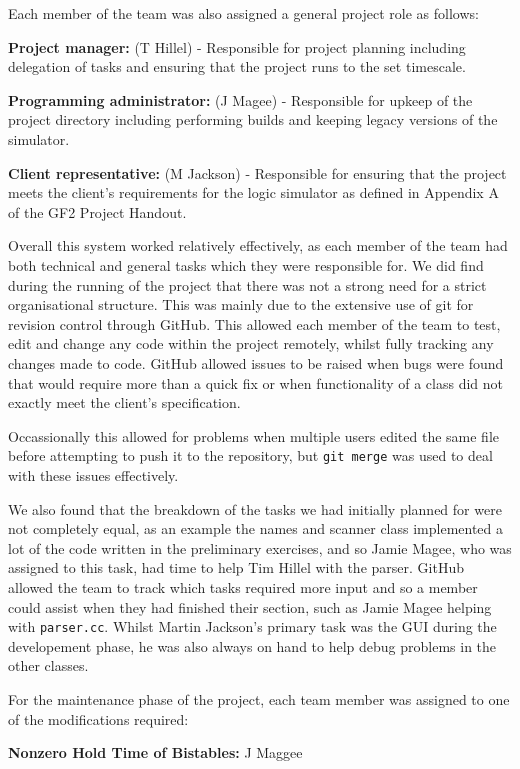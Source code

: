 \documentclass[a4paper,10pt]{article}
\begin{document}
Each member of the team was also assigned a general project role as follows:

\textbf{Project manager:} (T Hillel) - Responsible for project planning including delegation of tasks and ensuring that the project runs to the set timescale.

\textbf{Programming administrator:} (J Magee) - Responsible for upkeep of the project directory including performing builds and keeping legacy versions of the simulator.

\textbf{Client representative:} (M Jackson) - Responsible for ensuring that the project meets the client's requirements for the logic simulator as defined in Appendix A of the GF2 Project Handout.

Overall this system worked relatively effectively, as each member of the team had both technical and general tasks which they were responsible for. We did find during the running of the project that there was not a strong need for a strict organisational structure. This was mainly due to the extensive use of git for revision control through GitHub. This allowed each member of the team to test, edit and change any code within the project remotely, whilst fully tracking any changes made to code. GitHub allowed issues to be raised when bugs were found that would require more than a quick fix or when functionality of a class did not exactly meet the client's specification.

Occassionally this allowed for problems when multiple users edited the same file before attempting to push it to the repository, but \texttt{git merge} was used to deal with these issues effectively.

We also found that the breakdown of the tasks we had initially planned for were not completely equal, as an example the names and scanner class implemented a lot of the code written in the preliminary exercises, and so Jamie Magee, who was assigned to this task, had time to help Tim Hillel with the parser. GitHub allowed the team to track which tasks required more input and so a member could assist when they had finished their section, such as Jamie Magee helping with \texttt{parser.cc}. Whilst Martin Jackson's primary task was the GUI during the developement phase, he was also always on hand to help debug problems in the other classes.

For the maintenance phase of the project, each team member was assigned to one of the modifications required:

\textbf{Nonzero Hold Time of Bistables:} J Maggee
\end{document}
